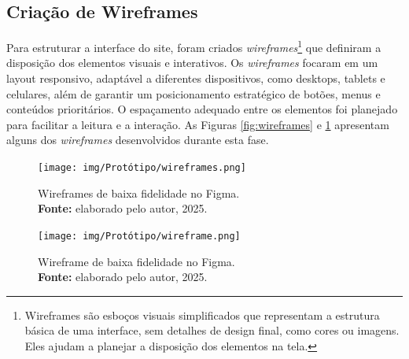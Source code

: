\subsection{Criação de Wireframes}
Para estruturar a interface do site, foram criados \textit{wireframes}\footnote{Wireframes são esboços visuais simplificados que representam a estrutura básica de uma interface, sem detalhes de design final, como cores ou imagens. Eles ajudam a planejar a disposição dos elementos na tela.} que definiram a disposição dos elementos visuais e interativos. Os \textit{wireframes} focaram em um layout responsivo, adaptável a diferentes dispositivos, como desktops, tablets e celulares, além de garantir um posicionamento estratégico de botões, menus e conteúdos prioritários. O espaçamento adequado entre os elementos foi planejado para facilitar a leitura e a interação. As Figuras \ref{fig:wireframes} e \ref{fig:wireframe} apresentam alguns dos \textit{wireframes} desenvolvidos durante esta fase.


\begin{figure}[H]
    \centering
    \begin{minipage}[b]{0.48\textwidth}
        \centering
        \texttt{[image: img/Protótipo/wireframes.png]}
        \caption{Wireframes de baixa fidelidade no Figma. \\
            \textbf{Fonte:} elaborado pelo autor, 2025.}
        \label{fig:wireframes}
    \end{minipage}
    \hfill
    \begin{minipage}[b]{0.48\textwidth}
        \centering
        \texttt{[image: img/Protótipo/wireframe.png]}
        \caption{Wireframe de baixa fidelidade no Figma. \\
            \textbf{Fonte:} elaborado pelo autor, 2025.}
        \label{fig:wireframe}
    \end{minipage}
\end{figure}


